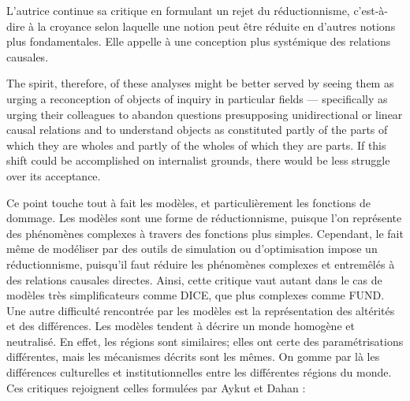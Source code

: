 L'autrice continue sa critique en formulant un rejet du réductionnisme, c'est-à-dire à la croyance selon laquelle une notion peut être réduite en d'autres notions plus fondamentales. Elle appelle à une conception plus systémique des relations causales. 

\begin{authoredquote}
    The spirit, therefore, of these analyses might be better served by seeing them as urging a reconception of objects of inquiry in particular fields — specifically as urging their colleagues to abandon questions presupposing unidirectional or linear causal relations and to understand objects as constituted partly of the parts of which they are wholes and partly of the wholes of which they are parts. If this shift could be accomplished on internalist grounds, there would be less struggle over its acceptance.
\end{authoredquote}

Ce point touche tout à fait les modèles, et particulièrement les fonctions de dommage. Les modèles sont une forme de réductionnisme, puisque l'on représente des phénomènes complexes à travers des fonctions plus simples. Cependant, le fait même de modéliser par des outils de simulation ou d'optimisation impose un réductionnisme, puisqu'il faut réduire les phénomènes complexes et entremêlés à des relations causales directes. Ainsi, cette critique vaut autant dans le cas de modèles très simplificateurs comme DICE, que plus complexes comme FUND.   \\


Une autre difficulté rencontrée par les modèles est la représentation des altérités et des différences. Les modèles tendent à décrire un monde homogène et neutralisé. En effet, les régions sont similaires; elles ont certe des paramétrisations différentes, mais les mécanismes décrits sont les mêmes. On gomme par là les différences culturelles et institutionnelles entre les différentes régions du monde. \\

Ces critiques rejoignent celles formulées par Aykut et Dahan : 

